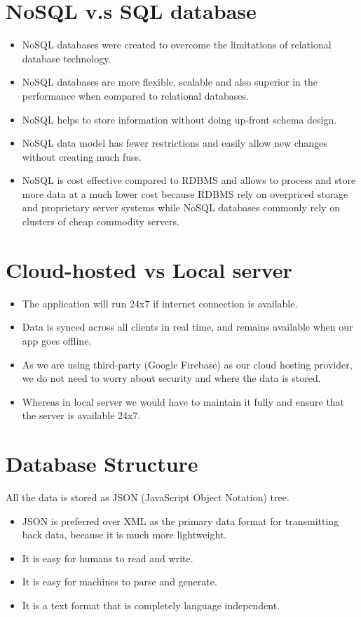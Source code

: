 \documentclass{report}
\begin{document}
\section{NoSQL v.s SQL database}
\begin{itemize}
\item NoSQL databases were created to overcome the limitations of relational database technology.
\item NoSQL databases are more flexible, scalable and also superior in the performance when compared to relational databases.
\item NoSQL helps to store information without doing up‐front schema design.
\item NoSQL data model has fewer restrictions and easily allow new changes without creating much fuss.
\item NoSQL is cost effective compared to RDBMS and allows to process and store more data at a much lower cost because RDBMS rely on overpriced storage and proprietary server systems while NoSQL databases commonly rely on clusters of cheap commodity servers.
\end{itemize}

\section{Cloud-hosted vs Local server}
\begin{itemize}
\item The application will run 24x7 if internet connection is available.
\item Data is synced across all clients in real time, and remains available when our app goes offline.
\item As we are using third-party (Google Firebase) as our cloud hosting provider, we do not need to worry about security and  where the data is stored. 
\item Whereas in local server we would have to maintain it fully and ensure that the server is available 24x7.
\end{itemize}


\section{Database Structure}
All the data is stored as JSON (JavaScript Object Notation) tree.
\begin{itemize}
\item JSON is preferred over XML as the primary data format for transmitting back data, because it is much more lightweight.
\item It is easy for humans to read and write. 
\item It is easy for machines to parse and generate.
\item It is a text format that is completely language independent.\\
\end{itemize}
\end{document}
